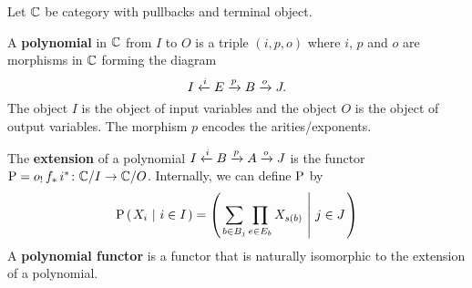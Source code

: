 Let $\catC$ be category with pullbacks and terminal object.

\begin{definition}\label{defn:Polynomial}
   \leanok
  A \textbf{polynomial} in $\catC$ from $I$ to $O$ is a triple $(i,p,o)$ where
  $i$, $p$ and $o$ are morphisms in $\catC$ forming the diagram
  $$\polyspan IEBJipo.$$
  The object $I$ is the object of input variables and the object $O$ is the object of output
  variables. The morphism $p$ encodes the arities/exponents.
\end{definition}





\begin{definition}
  \label{defn:extension}
   \leanok
  The \textbf{extension} of a polynomial $\polyspan IBAJipo$ is the functor
  $\upP = o_! \, f_* \, i^* \colon \catC / I \to \catC/ O$. Internally, we can define $\upP$ by
  $$\upP \seqbn{X_i}{i \in I} = \seqbn{\sum_{b \in B_j} \prod_{e \in E_b} X_{s(b)}}{j \in J}$$
  A \textbf{polynomial functor} is a functor that is naturally isomorphic to the extension of a polynomial.
  \end{definition}
